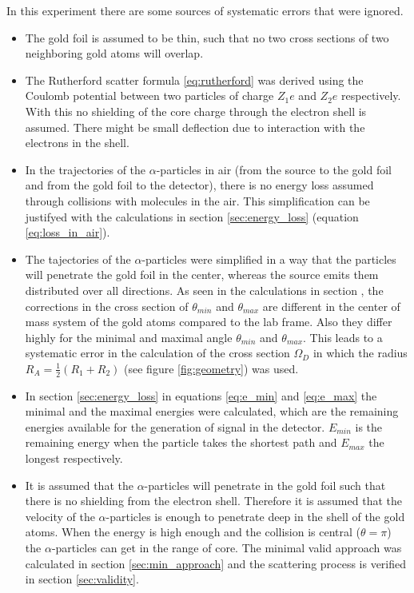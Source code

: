 \documentclass[a4paper]{article}
\begin{document}
In this experiment there are some sources of systematic errors that were ignored.

\begin{itemize}
\item The gold foil is assumed to be thin, such that no two cross sections of two neighboring gold atoms will overlap.
\item The Rutherford scatter formula \eqref{eq:rutherford} was derived using the Coulomb potential between two particles of charge $Z_1 e$ and $Z_2 e$ respectively. With this no shielding of the core charge through the electron shell is assumed. There might be small deflection due to interaction with the electrons in the shell.
\item In the trajectories of the $\alpha$-particles in air (from the source to the gold foil and from the gold foil to the detector), there is no energy loss assumed through collisions with molecules in the air. This simplification can be justifyed with the calculations in section \ref{sec:energy_loss} (equation \eqref{eq:loss_in_air}).
\item The tajectories of the $\alpha$-particles were simplified in a way that the particles will penetrate the gold foil in the center, whereas the source emits them distributed over all directions. As seen in the calculations in section \label{sec:crosssection}, the corrections in the cross section of $\theta_{min}$ and $\theta_{max}$ are different in the center of mass system of the gold atoms compared to the lab frame. Also they differ highly for the minimal and maximal angle $\theta_{min}$ and $\theta_{max}$. This leads to a systematic error in the calculation of the cross section $\Omega_D$ in which the radius $R_A = \frac{1}{2} \left( R_1 + R_2 \right)$ (see figure \ref{fig:geometry}) was used.
\item In section \ref{sec:energy_loss} in equations \eqref{eq:e_min} and \eqref{eq:e_max} the minimal and the maximal energies were calculated, which are the remaining energies available for the generation of signal in the detector. $E_{min}$ is the remaining energy when the particle takes the shortest path and $E_{max}$ the longest respectively.
\item It is assumed that the $\alpha$-particles will penetrate in the gold foil such that there is no shielding from the electron shell. Therefore it is assumed that the velocity of the $\alpha$-particles is enough to penetrate deep in the shell of the gold atoms. When the energy is high enough and the collision is central ($\theta = \pi$) the $\alpha$-particles can get in the range of core. The minimal valid approach was calculated in section \ref{sec:min_approach} and the scattering process is verified in section \ref{sec:validity}.
\end{itemize}
\end{document}
